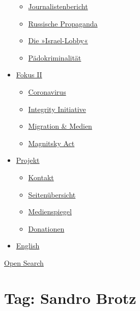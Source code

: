\begin{itemize}
  \begin{itemize}
  \tightlist
  \item
    \href{https://swprs.org/bericht-eines-journalisten/}{Journalistenbericht}
  \item
    \href{https://swprs.org/russische-propaganda/}{Russische Propaganda}
  \item
    \href{https://swprs.org/die-israel-lobby-fakten-und-mythen/}{Die
    »Israel-Lobby«}
  \item
    \href{https://swprs.org/geopolitik-und-paedokriminalitaet/}{Pädokriminalität}
  \end{itemize}
\item
  \href{https://swprs.org/migration-und-medien/}{Fokus II}

  \begin{itemize}
  \tightlist
  \item
    \href{https://swprs.org/covid-19-hinweis-ii/}{Coronavirus}
  \item
    \href{https://swprs.org/die-integrity-initiative/}{Integrity
    Initiative}
  \item
    \href{https://swprs.org/migration-und-medien/}{Migration \& Medien}
  \item
    \href{https://swprs.org/der-fall-magnitsky/}{Magnitsky Act}
  \end{itemize}
\item
  \href{https://swprs.org/kontakt/}{Projekt}

  \begin{itemize}
  \tightlist
  \item
    \href{https://swprs.org/kontakt/}{Kontakt}
  \item
    \href{https://swprs.org/uebersicht/}{Seitenübersicht}
  \item
    \href{https://swprs.org/medienspiegel/}{Medienspiegel}
  \item
    \href{https://swprs.org/donationen/}{Donationen}
  \end{itemize}
\item
  \href{https://swprs.org/contact/}{English}
\end{itemize}

\protect\hyperlink{}{Open Search}

\hypertarget{tag-sandro-brotz}{%
\section{Tag: Sandro Brotz}\label{tag-sandro-brotz}}

